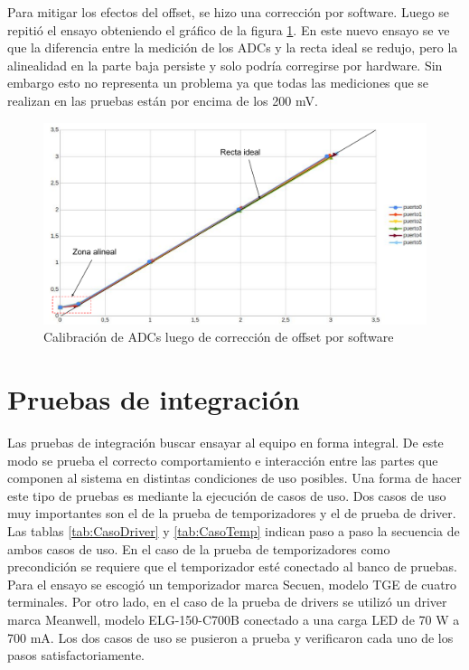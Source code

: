 Para mitigar los efectos del offset, se hizo una corrección por software. 
Luego se repitió el ensayo obteniendo el gráfico de la figura \ref{fig:CorregidoCalADCzoom}. En este nuevo ensayo se ve que la diferencia entre la medición de los ADCs y la recta ideal se redujo, pero la alinealidad en la parte baja persiste y solo podría corregirse por hardware. Sin embargo esto no representa un problema ya que todas las mediciones que se realizan en las pruebas están por encima de los 200 mV.

\begin{figure}[H]
	\centering
	\includegraphics[width=1\textwidth]{./Figures/CorregidoCalADCzoom.pdf}
	\caption{Calibración de ADCs luego de corrección de offset por software}
	\label{fig:CorregidoCalADCzoom}
\end{figure}


\section{Pruebas de integración}

Las pruebas de integración buscar ensayar al equipo en forma integral. De este modo se prueba el correcto comportamiento e interacción entre las partes que componen al sistema en distintas  condiciones de uso posibles. 
Una forma de hacer este tipo de pruebas es mediante la ejecución de casos de uso.
Dos casos de uso muy importantes son el de la prueba de temporizadores y el de prueba de driver. Las tablas \ref{tab:CasoDriver} y \ref{tab:CasoTemp} indican paso a paso la secuencia de ambos casos de uso.
En el caso de la prueba de temporizadores como precondición se requiere que el temporizador esté conectado al banco de pruebas. Para el ensayo se escogió un temporizador marca Secuen, modelo TGE de cuatro terminales.
Por otro lado, en el caso de la prueba de drivers se utilizó un driver marca Meanwell, modelo ELG-150-C700B conectado a una carga LED de 70 W a 700 mA.
Los dos casos de uso se pusieron a prueba y verificaron cada uno de los pasos satisfactoriamente.




